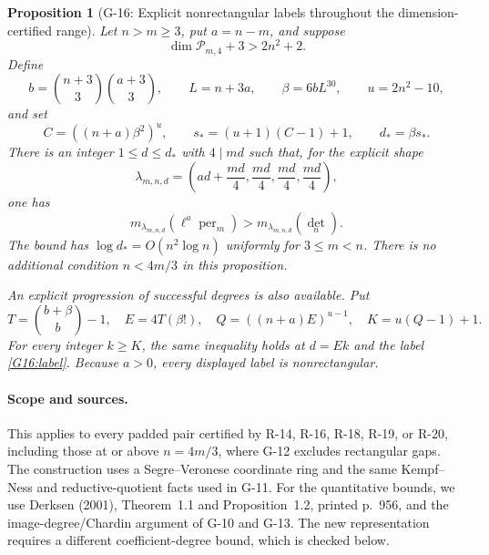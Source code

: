 \documentclass[11pt,a4paper]{article}
\newtheorem{proposition}{Proposition}
\theoremstyle{definition}\newtheorem{definition}{Definition}
\begin{document}
\begin{proposition}[G-16: Explicit nonrectangular labels throughout the dimension-certified range]\label{G-16}
Let $n>m\geq3$, put $a=n-m$, and suppose
\begin{equation}\label{G16:dimensionhypothesis}
 \dim\mathcal P_{m,4}+3>2n^2+2.
\end{equation}
Define
\[
 b=\binom{n+3}{3}\binom{a+3}{3},\qquad L=n+3a,
 \qquad \beta=6bL^{30},\qquad u=2n^2-10,
\]
and set
\begin{equation}\label{G16:firstdegree}
 C=((n+a)\beta^2)^u,\qquad
 s_*=(u+1)(C-1)+1,\qquad d_* =\beta s_*.
\end{equation}
There is an integer $1\leq d\leq d_*$ with $4\mid md$ such that,
for the explicit shape
\begin{equation}\label{G16:label}
 \lambda_{m,n,d}=
 \left(ad+\frac{md}{4},\frac{md}{4},\frac{md}{4},\frac{md}{4}\right),
\end{equation}
one has
\[
 m_{\lambda_{m,n,d}}(\ell^a\operatorname{per}_m)
       >m_{\lambda_{m,n,d}}(\det_n).
\]
The bound has $\log d_*=O(n^2\log n)$ uniformly for $3\leq m<n$.
There is no additional condition $n<4m/3$ in this proposition.

An explicit progression of successful degrees is also available. Put
\[
 T=\binom{b+\beta}{b}-1,\quad E=4T(\beta!),\quad
 Q=((n+a)E)^{u-1},\quad K=u(Q-1)+1.
\]
For every integer $k\geq K$, the same inequality holds at
$d=Ek$ and the label \eqref{G16:label}.
Because $a>0$, every displayed label is nonrectangular.
\end{proposition}

\paragraph{Scope and sources.}
This applies to every padded pair certified by R-14, R-16, R-18,
R-19, or R-20, including those at or above $n=4m/3$, where G-12
excludes rectangular gaps. The construction uses a Segre--Veronese
coordinate ring and the same Kempf--Ness and reductive-quotient
facts used in G-11. For the quantitative bounds, we use Derksen
(2001), Theorem~1.1 and Proposition~1.2, printed p.~956, and the
image-degree/Chardin argument of G-10 and G-13. The new representation
requires a different coefficient-degree bound, which is checked below.
\end{document}
